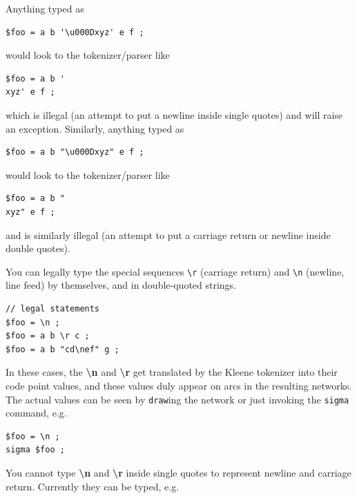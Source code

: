 \documentclass[letterpaper,12pt]{article}
\begin{document}
Anything typed as 

\begin{Verbatim}[fontsize=\small]
$foo = a b '\u000Dxyz' e f ;
\end{Verbatim}

\noindent
would look to the tokenizer/parser like

\begin{Verbatim}[fontsize=\small]
$foo = a b '
xyz' e f ;
\end{Verbatim}

\noindent
which is illegal (an attempt to put a newline inside single quotes) and will
raise an exception.  Similarly, anything typed as

\begin{Verbatim}[fontsize=\small]
$foo = a b "\u000Dxyz" e f ;
\end{Verbatim}

\noindent
would look to the tokenizer/parser like

\begin{Verbatim}[fontsize=\small]
$foo = a b "
xyz" e f ;
\end{Verbatim}

\noindent
and is similarly illegal (an attempt to put a carriage return or newline
inside double quotes).  

You can legally type the special sequences \texttt{\textbackslash{}r}
(carriage return) and \texttt{\textbackslash{}n} (newline, line feed) by
themselves, and in double-quoted strings.

\begin{Verbatim}[fontsize=\small]
// legal statements
$foo = \n ;
$foo = a b \r c ;
$foo = a b "cd\nef" g ;
\end{Verbatim}

\noindent
In these cases, the \textbf{\textbackslash{}n} and
\textbf{\textbackslash{}r} get translated by the Kleene tokenizer into
their code point values, and these values duly appear on arcs in the
resulting networks.  The actual values can be seen by \texttt{draw}ing
the network or just invoking the \texttt{sigma} command, e.g.

\begin{Verbatim}[fontsize=\small]
$foo = \n ;
sigma $foo ;
\end{Verbatim}

You cannot type \textbf{\textbackslash{}n} and \textbf{\textbackslash{}r}
inside single quotes to represent newline and carriage return.  Currently
they can be typed, e.g.
\end{document}
